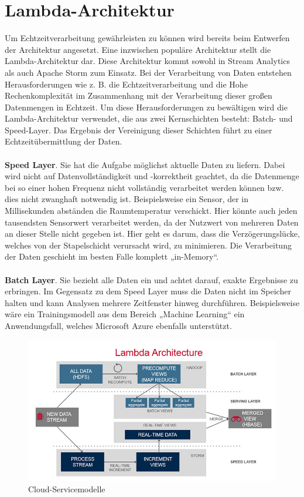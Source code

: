 \section{Lambda-Architektur}
Um Echtzeitverarbeitung gewährleisten zu können wird bereits beim Entwerfen der Architektur angesetzt. Eine inzwischen populäre Architektur stellt die Lambda-Architektur dar. Diese Architektur kommt sowohl in Stream Analytics als auch Apache Storm zum Einsatz. Bei der Verarbeitung von Daten entstehen Herausforderungen wie z. B. die Echtzeitverarbeitung und die Hohe Rechenkomplexität im Zusammenhang mit der Verarbeitung dieser großen Datenmengen in Echtzeit. Um diese Herausforderungen zu bewältigen wird die Lambda-Architektur verwendet, die aus zwei Kernschichten besteht: Batch- und Speed-Layer. Das Ergebnis der Vereinigung dieser Schichten führt zu einer Echtzeitübermittlung der Daten. \\ \\ \textbf{Speed Layer}. Sie hat die Aufgabe möglichst aktuelle Daten zu liefern. Dabei wird nicht auf Datenvollständigkeit und -korrektheit geachtet, da die Datenmenge bei so einer hohen Frequenz nicht vollständig verarbeitet werden können bzw. dies nicht zwanghaft notwendig ist. Beispielsweise ein Sensor, der in Millisekunden abständen die Raumtemperatur verschickt. Hier könnte auch jeden tausendsten Sensorwert verarbeitet werden, da der Nutzwert von mehreren Daten an dieser Stelle nicht gegeben ist. Hier geht es darum, dass die Verzögerungslücke, welches von der Stapelschicht verursacht wird, zu minimieren. Die Verarbeitung der Daten geschieht im besten Falle komplett „in-Memory“.\\ \\ \textbf{Batch Layer}. Sie bezieht alle Daten ein und achtet darauf, exakte Ergebnisse zu erbringen. Im Gegensatz zu dem Speed Layer muss die Daten nicht im Speicher halten und kann Analysen mehrere Zeitfenster hinweg durchführen. Beispielsweise wäre ein Trainingsmodell aus dem Bereich „Machine Learning“ ein Anwendungsfall, welches Microsoft Azure ebenfalls unterstützt. 

\begin{figure}[h!]
	\centering
	\includegraphics[width=1.0\linewidth]{images/lambda-architecture}
	\caption{Cloud-Servicemodelle} %
	\label{fig:cnn_structure}
\end{figure}